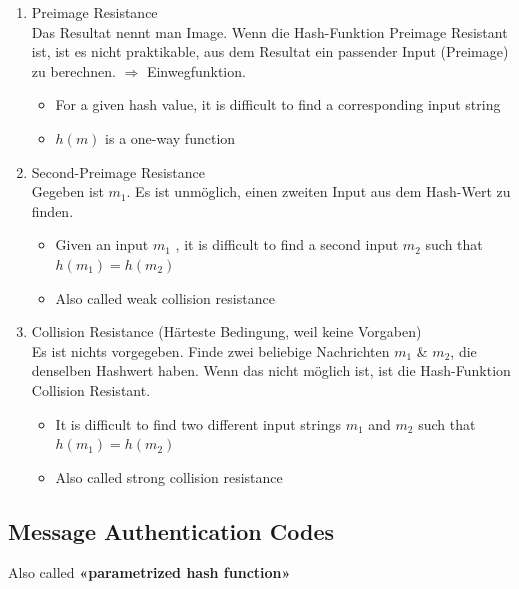 \begin{enumerate}
\def\labelenumi{\arabic{enumi}.}
\tightlist
\item
  Preimage Resistance\\
  Das Resultat nennt man Image. Wenn die Hash-Funktion Preimage Resistant ist, ist es nicht  praktikable, aus dem Resultat ein passender Input (Preimage) zu berechnen. $\Rightarrow$ Einwegfunktion.
  \begin{itemize}
\tightlist
\item
  For a given hash value, it is difficult to find a corresponding input
  string
\item
  $h(m)$ is a one-way function
\end{itemize}

\item
  Second-Preimage Resistance\\
  Gegeben ist $m_1$. Es ist unmöglich, einen zweiten Input aus dem Hash-Wert zu finden.
  \begin{itemize}
\tightlist
\item
  Given an input $m_1$ , it is difficult to find a second input $m_2$ such
  that $h(m_1) = h(m_2)$
\item
  Also called weak collision resistance
\end{itemize}

\item
  Collision Resistance (Härteste Bedingung, weil keine Vorgaben)\\
 Es ist nichts vorgegeben. Finde zwei beliebige Nachrichten $m_1$ \& $m_2$, die denselben Hashwert haben. Wenn das nicht möglich ist, ist die Hash-Funktion Collision Resistant.

\begin{itemize}
\tightlist
\item
  It is difficult to find two different input strings $m_1$ and $m_2$ such
  that $h(m_1) = h(m_2)$
\item
  Also called strong collision resistance
\end{itemize}
 
\end{enumerate}


\hypertarget{message-authentication-codes}{%
\subsection{Message Authentication
Codes}\label{message-authentication-codes}}

Also called \textbf{«parametrized hash function»}

